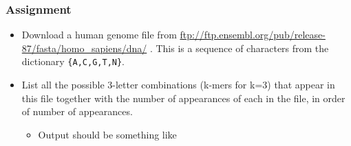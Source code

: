 \begin{Shaded}
\begin{Highlighting}[]


 
\NormalTok{\{}
  \NormalTok{,}
  \NormalTok{,}

   
    \NormalTok{; } \NormalTok{b[}\NormalTok{];                         }
   

   
   

   \NormalTok{;}
\NormalTok{\}}
\end{Highlighting}
\end{Shaded}

\subsubsection{Assignment}\label{assignment}

\begin{itemize}
\itemsep1pt\parskip0pt
\item
  Download a human genome file from
  \url{ftp://ftp.ensembl.org/pub/release-87/fasta/homo_sapiens/dna/} .
  This is a sequence of characters from the dictionary
  \texttt{\{A,C,G,T,N\}}.
\item
  List all the possible 3-letter combinations (k-mers for k=3) that
  appear in this file together with the number of appearances of each in
  the file, in order of number of appearances.

  \begin{itemize}
  \itemsep1pt\parskip0pt
  \item
    Output should be something like
  \end{itemize}
\end{itemize}

